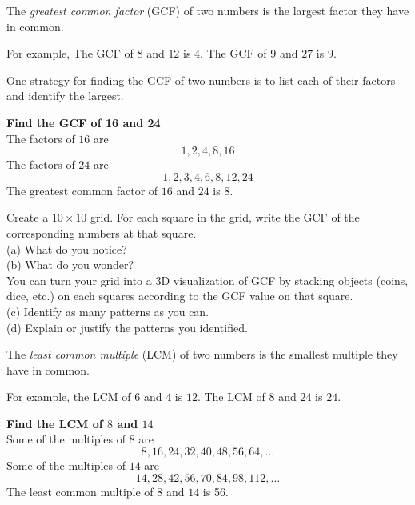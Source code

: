 \begin{definition} 
The \emph{greatest common factor} (GCF) of two numbers is the largest factor they have in common.  

For example, The GCF of \(8\) and \(12\) is \(4\). The GCF of \(9\) and \(27\) is \(9\).  
\end{definition}
One strategy for finding the GCF of two numbers is to list each of their factors and identify the largest.  
\begin{example}\textbf{Find the GCF of 16 and 24}
\\ 
The factors of \(16\) are 
\[1,2, 4, 8, 16\]
The factors of \(24\) are 
\[ 1, 2, 3, 4, 6, 8, 12, 24 \]
The greatest common factor of \(16\) and \(24\) is \(8\). 
\end{example}
\begin{exercise}
Create a \(10 \times 10\) grid.  For each square in the grid, write the GCF of the corresponding numbers at that square.  
	\\ \hspace*{15mm}(a) What do you notice?
	\\ \hspace*{15mm}(b) What do you wonder? 
\\
You can turn your grid into a 3D visualization of GCF by stacking objects (coins, dice, etc.) on each squares according to the GCF value on that square. 
	\\ \hspace*{15mm}(c) Identify as many patterns as you can.   
	\\ \hspace*{15mm}(d) Explain or justify the patterns you identified. 
\label{ex:gcdgrid}
\end{exercise}


\begin{definition} 
The \emph{least common multiple} (LCM) of two numbers is the smallest multiple they have in common.  

For example, the LCM of \(6\) and \(4\) is \(12\).  The LCM of \(8\) and \(24\) is \(24\).   
\end{definition}
\begin{example}\textbf{Find the LCM of \(8\) and \(14\)}
\\
Some of the multiples of \(8\) are 
	\[8, 16, 24, 32, 40, 48, 56, 64, \dots \]
Some of the multiples of \(14\) are 
	\[14, 28, 42, 56, 70, 84, 98, 112, \dots \]	
The least common multiple of \(8\) and \(14\) is 56.  
\end{example}

